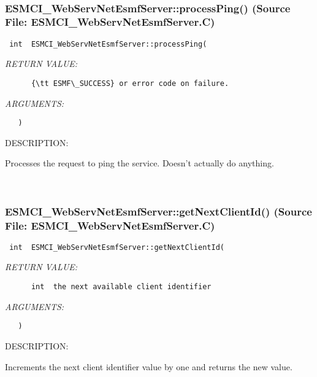  
\mbox{}\hrulefill\
 
\subsubsection{ESMCI\_WebServNetEsmfServer::processPing() (Source File: ESMCI\_WebServNetEsmfServer.C)}


  
\begin{verbatim} int  ESMCI_WebServNetEsmfServer::processPing(\end{verbatim}{\em RETURN VALUE:}
\begin{verbatim}      {\tt ESMF\_SUCCESS} or error code on failure.\end{verbatim}{\em ARGUMENTS:}
\begin{verbatim}   )\end{verbatim}
{\sf DESCRIPTION:\\ }


      Processes the request to ping the service.  Doesn't actually do anything.
   
 
\mbox{}\hrulefill\
 
\subsubsection{ESMCI\_WebServNetEsmfServer::getNextClientId() (Source File: ESMCI\_WebServNetEsmfServer.C)}


  
\begin{verbatim} int  ESMCI_WebServNetEsmfServer::getNextClientId(\end{verbatim}{\em RETURN VALUE:}
\begin{verbatim}      int  the next available client identifier\end{verbatim}{\em ARGUMENTS:}
\begin{verbatim}   )\end{verbatim}
{\sf DESCRIPTION:\\ }


      Increments the next client identifier value by one and returns the
      new value.
   
 
\mbox{}\hrulefill\
 
